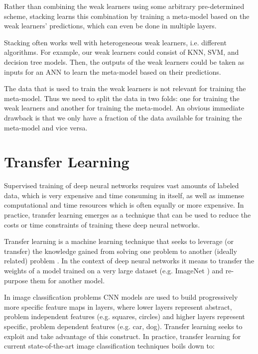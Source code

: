 Rather than combining the weak learners using some arbitrary pre-determined scheme, stacking learns this combination by training a meta-model based on the weak learners' predictions, which can even be done in multiple layers.

Stacking often works well with heterogeneous weak learners, i.e. different algorithms. For example, our weak learners could consist of \ac{KNN}, \ac{SVM}, and decision tree models. Then, the outputs of the weak learners could be taken as inputs for an \ac{ANN} to learn the meta-model based on their predictions.

The data that is used to train the weak learners is not relevant for training the meta-model. Thus we need to split the data in two folds: one for training the weak learners and another for training the meta-model. An obvious immediate drawback is that we only have a fraction of the data available for training the meta-model and vice versa.

\section{Transfer Learning}
\label{section:transferlearning}

Supervised training of deep neural networks requires vast amounts of labeled data, which is very expensive and time consuming in itself, as well as immense computational and time resources which is often equally or more expensive. In practice, transfer learning emerges as a technique that can be used to reduce the costs or time constraints of training these deep neural networks.

Transfer learning is a machine learning technique that seeks to leverage (or transfer) the knowledge gained from solving one problem to another (ideally related) problem \cite{deeptransferlearning}. In the context of deep neural networks it means to transfer the weights of a model trained on a very large dataset (e.g. ImageNet \cite{imagenet}) and re-purpose them for another model.

In image classification problems \ac{CNN} models are used to build progressively more specific feature maps in layers, where lower layers represent abstract, problem independent features (e.g. squares, circles) and higher layers represent specific, problem dependent features (e.g. car, dog). Transfer learning seeks to exploit and take advantage of this construct. In practice, transfer learning for current state-of-the-art image classification techniques boils down to:

